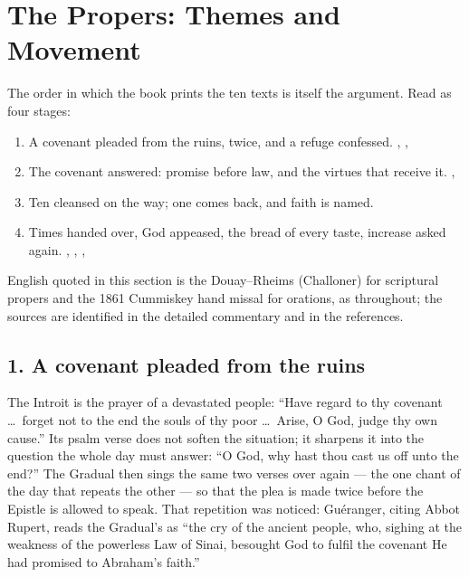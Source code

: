 \sectionguard
\section*{The Propers: Themes and Movement}
\label{triptych:brief-synthesis:start}


The order in which the book prints the ten texts is itself the argument. Read
as four stages:

\begin{enumerate}[leftmargin=1.5em, itemsep=0.1em]
  \item A covenant pleaded from the ruins, twice, and a refuge confessed. , , 
  \item The covenant answered: promise before law, and the virtues that receive it. , 
  \item Ten cleansed on the way; one comes back, and faith is named. 
  \item Times handed over, God appeased, the bread of every taste, increase asked again. , , , 
\end{enumerate}

English quoted in this section is the Douay--Rheims (Challoner) for scriptural
propers and the 1861 Cummiskey hand missal for orations, as throughout; the
sources are identified in the detailed commentary and in the references.

\subsection*{1. A covenant pleaded from the ruins}

The Introit is the prayer of a devastated people: ``Have regard to thy
covenant \dots\ forget not to the end the souls of thy poor \dots\ Arise, O
God, judge thy own cause.'' Its psalm verse does not soften the situation; it
sharpens it into the question the whole day must answer: ``O God, why hast
thou cast us off unto the end?'' The Gradual then sings the same two verses
over again --- the one chant of the day that repeats the other --- so that the
plea is made twice before the Epistle is allowed to speak. That repetition was
noticed: Guéranger, citing Abbot Rupert, reads the Gradual's
 as ``the cry of the ancient
people, who, sighing at the weakness of the powerless Law of Sinai, besought
God to fulfil the covenant He had promised to Abraham's faith.''

